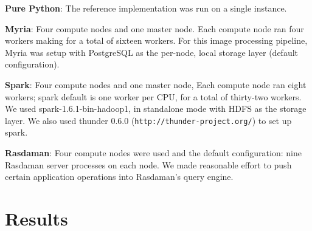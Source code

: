 \documentclass[a0,landscape]{a0poster}
\begin{document}
\begin{multicols}{3}
\textbf{Pure Python}: The reference implementation was run on a single instance.

\textbf{Myria}:  Four compute nodes and one master node. Each compute node ran
four workers making for a total of sixteen workers. For this image processing
pipeline, Myria was setup with PostgreSQL as the per-node, local storage layer (default configuration).

\textbf{Spark}: Four compute nodes and one master node, Each compute node ran
eight workers; spark default is one worker per CPU, for a total of thirty-two
workers. We used spark-1.6.1-bin-hadoop1, in standalone mode with HDFS as the
storage layer. We also used thunder 0.6.0 (\texttt{http://thunder-project.org/})
to set up spark.

\textbf{Rasdaman}: Four compute nodes were used and the default configuration:
nine Rasdaman server processes on each node. We made reasonable effort to push
certain application operations into Rasdaman’s query engine.



\section*{Results}


\end{multicols}
\end{document}
